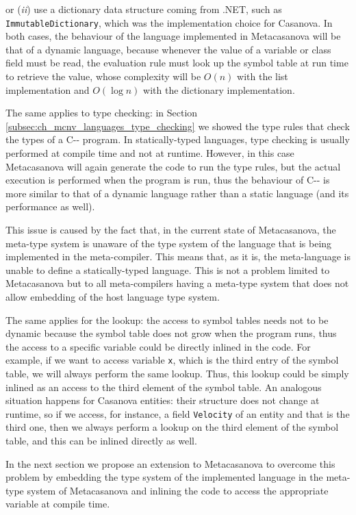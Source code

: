 \noindent
or (\textit{ii}) use a dictionary data structure coming from .NET, such as\\ \texttt{ImmutableDictionary}, which was the implementation choice for Casanova. In both cases, the behaviour of the language implemented in Metacasanova will be that of a dynamic language, because whenever the value of a variable or class field must be read, the evaluation rule must look up the symbol table at run time to retrieve the value, whose complexity will be $O(n)$ with the list implementation and $O(\log n)$ with the dictionary implementation.

The same applies to type checking: in Section \ref{subsec:ch_mcnv_languages_type_checking} we showed the type rules that check the types of a C-{}- program. In statically-typed languages, type checking is usually performed at compile time and not at runtime. However, in this case Metacasanova will again generate the code to run the type rules, but the actual execution is performed when the program is run, thus the behaviour of C-{}- is more similar to that of a dynamic language rather than a static language (and its performance as well).

This issue is caused by the fact that, in the current state of Metacasanova, the meta-type system is unaware of the type system of the language that is being implemented in the meta-compiler. This means that, as it is, the meta-language is unable to define a statically-typed language. This is not a problem limited to Metacasanova but to all meta-compilers having a meta-type system that does not allow embedding of the host language type system. 

The same applies for the lookup: the access to symbol tables needs not to be dynamic because the symbol table does not grow when the program runs, thus the access to a specific variable could be directly inlined in the code. For example, if we want to access variable \texttt{x}, which is the third entry of the symbol table, we will always perform the same lookup. Thus, this lookup could be simply inlined as an access to the third element of the symbol table. An analogous situation happens for Casanova entities: their structure does not change at runtime, so if we access, for instance, a field \texttt{Velocity} of an entity and that is the third one, then we always perform a lookup on the third element of the symbol table, and this can be inlined directly as well.

In the next section we propose an extension to Metacasanova to overcome this problem by embedding the type system of the implemented language in the meta-type system of Metacasanova and inlining the code to access the appropriate variable at compile time.

